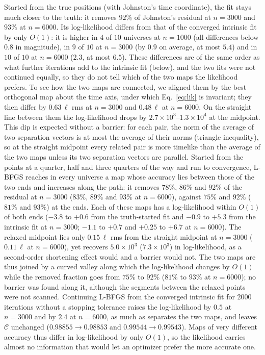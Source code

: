 \documentclass[prd,twocolumn,superscriptaddress,nofootinbib,amsmath,amssymb,floatfix]{revtex4-2}
\begin{document}
Started from the true positions (with Johnston's time coordinate), the fit stays much closer to the truth: it removes $92\%$ of Johnston's residual at $n=3000$ and $93\%$ at $n=6000$. Its log-likelihood differs from that of the converged intrinsic fit by only $O(1)$: it is higher in $4$ of $10$ universes at $n=1000$ (all differences below $0.8$ in magnitude), in $9$ of $10$ at $n=3000$ (by $0.9$ on average, at most $5.4$) and in $10$ of $10$ at $n=6000$ ($2.3$, at most $6.5$). These differences are of the same order as what further iterations add to the intrinsic fit (below), and the two fits were not continued equally, so they do not tell which of the two maps the likelihood prefers. To see how the two maps are connected, we aligned them by the best orthogonal map about the time axis, under which Eq.~\eqref{eq:lik} is invariant; they then differ by $0.63\,\ell$ rms at $n=3000$ and $0.48\,\ell$ at $n=6000$. On the straight line between them the log-likelihood drops by $2.7\times10^3$--$1.3\times10^4$ at the midpoint. This dip is expected without a barrier: for each pair, the norm of the average of two separation vectors is at most the average of their norms (triangle inequality), so at the straight midpoint every related pair is more timelike than the average of the two maps unless its two separation vectors are parallel. Started from the points at a quarter, half and three quarters of the way and run to convergence, L-BFGS reaches in every universe a map whose accuracy lies between those of the two ends and increases along the path: it removes $78\%$, $86\%$ and $92\%$ of the residual at $n=3000$ ($83\%$, $89\%$ and $93\%$ at $n=6000$), against $75\%$ and $92\%$ ($81\%$ and $93\%$) at the ends. Each of these maps has a log-likelihood within $O(1)$ of both ends ($-3.8$ to $+0.6$ from the truth-started fit and $-0.9$ to $+5.3$ from the intrinsic fit at $n=3000$; $-1.1$ to $+0.7$ and $+0.25$ to $+6.7$ at $n=6000$). The relaxed midpoint lies only $0.15\,\ell$ rms from the straight midpoint at $n=3000$ ($0.11\,\ell$ at $n=6000$), yet recovers $5.0\times10^3$ ($7.3\times10^3$) in log-likelihood, as a second-order shortening effect would and a barrier would not. The two maps are thus joined by a curved valley along which the log-likelihood changes by $O(1)$ while the removed fraction goes from $75\%$ to $92\%$ ($81\%$ to $93\%$ at $n=6000$); no barrier was found along it, although the segments between the relaxed points were not scanned. Continuing L-BFGS from the converged intrinsic fit for 2000 iterations without a stopping tolerance raises the log-likelihood by $0.5$ at $n=3000$ and by $2.4$ at $n=6000$, as much as separates the two maps, and leaves $\mathcal C$ unchanged ($0.98855\to0.98853$ and $0.99544\to0.99543$). Maps of very different accuracy thus differ in log-likelihood by only $O(1)$, so the likelihood carries almost no information that would let an optimizer prefer the more accurate one.
\end{document}

